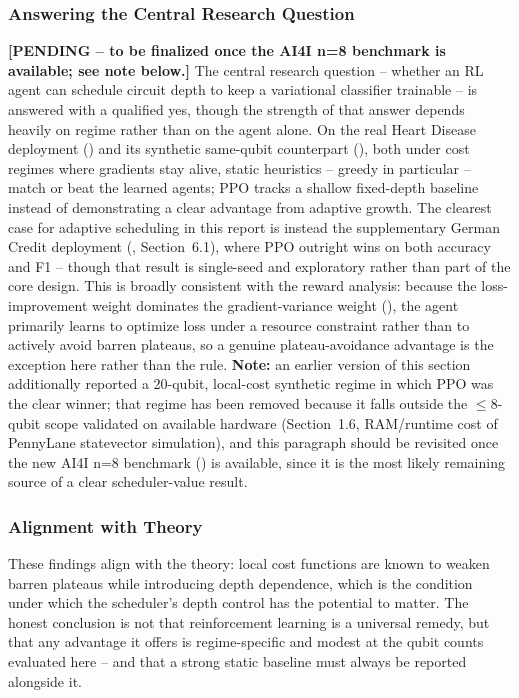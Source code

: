 \subsubsection{Answering the Central Research Question}
\textbf{[PENDING -- to be finalized once the AI4I n=8 benchmark is available; see note below.]} The central research question -- whether an RL agent can schedule circuit depth to keep a variational classifier trainable -- is answered with a qualified yes, though the strength of that answer depends heavily on regime rather than on the agent alone. On the real Heart Disease deployment () and its synthetic same-qubit counterpart (), both under cost regimes where gradients stay alive, static heuristics -- greedy in particular -- match or beat the learned agents; PPO tracks a shallow fixed-depth baseline instead of demonstrating a clear advantage from adaptive growth. The clearest case for adaptive scheduling in this report is instead the supplementary German Credit deployment (, Section~6.1), where PPO outright wins on both accuracy and F1 -- though that result is single-seed and exploratory rather than part of the core design. This is broadly consistent with the reward analysis: because the loss-improvement weight dominates the gradient-variance weight (), the agent primarily learns to optimize loss under a resource constraint rather than to actively avoid barren plateaus, so a genuine plateau-avoidance advantage is the exception here rather than the rule. \textbf{Note:} an earlier version of this section additionally reported a 20-qubit, local-cost synthetic regime in which PPO was the clear winner; that regime has been removed because it falls outside the $\le$8-qubit scope validated on available hardware (Section~1.6, RAM/runtime cost of PennyLane statevector simulation), and this paragraph should be revisited once the new AI4I n=8 benchmark () is available, since it is the most likely remaining source of a clear scheduler-value result.

\subsubsection{Alignment with Theory}
These findings align with the theory: local cost functions are known to weaken barren plateaus while introducing depth dependence, which is the condition under which the scheduler's depth control has the potential to matter. The honest conclusion is not that reinforcement learning is a universal remedy, but that any advantage it offers is regime-specific and modest at the qubit counts evaluated here -- and that a strong static baseline must always be reported alongside it.

